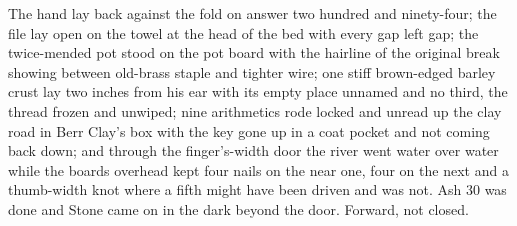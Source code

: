 The hand lay back against the fold on answer two hundred and ninety-four; the file lay open on the towel at the head of the bed with every gap left gap; the twice-mended pot stood on the pot board with the hairline of the original break showing between old-brass staple and tighter wire; one stiff brown-edged barley crust lay two inches from his ear with its empty place unnamed and no third, the thread frozen and unwiped; nine arithmetics rode locked and unread up the clay road in Berr Clay's box with the key gone up in a coat pocket and not coming back down; and through the finger's-width door the river went water over water while the boards overhead kept four nails on the near one, four on the next and a thumb-width knot where a fifth might have been driven and was not. Ash 30 was done and Stone came on in the dark beyond the door. Forward, not closed.
